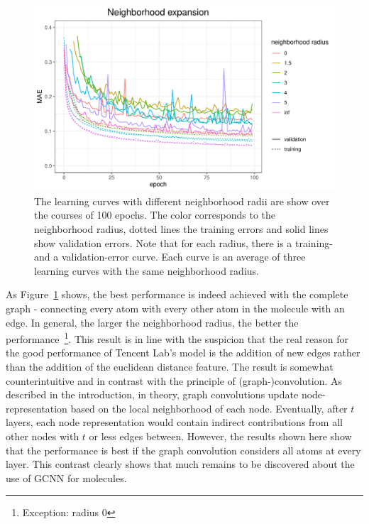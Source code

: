 \begin{figure}[H]
	\includegraphics[width=\linewidth]{figures/tencent-mpnn-neighborhood-expansion}
	
	\caption{The learning curves with different neighborhood radii are show over the courses of 100 epochs. The color corresponds to the neighborhood radius, dotted lines the training errors and solid lines show validation errors. Note that for each radius, there is a training- and a validation-error curve. Each curve is an average of three learning curves with the same neighborhood radius.}
	\label{fig:tencent-mpnn-neighborhood-expansion}
\end{figure}

As Figure~\ref{fig:tencent-mpnn-neighborhood-expansion} shows, the best performance is indeed achieved with the complete graph - connecting every atom with every other atom in the molecule with an edge. In general, the larger the neighborhood radius, the better the performance~\footnote{Exception: radius 0}. This result is in line with the suspicion that the real reason for the good performance of Tencent Lab's model is the addition of new edges rather than the addition of the euclidean distance feature.
The result is somewhat counterintuitive and in contrast with the principle of (graph-)convolution. As described in the introduction, in theory, graph convolutions update node-representation based on the local neighborhood of each node. Eventually, after $t$ layers, each node representation would contain indirect contributions from all other nodes with $t$ or less edges between. However, the results shown here show that the performance is best if the graph convolution considers all atoms at every layer. This contrast clearly shows that much remains to be discovered about the use of GCNN for molecules.

